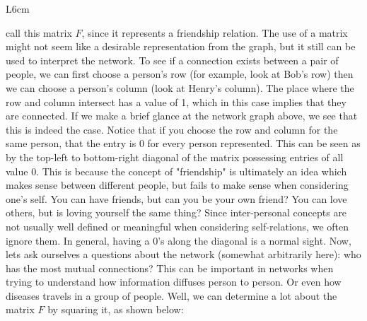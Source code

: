 \documentclass{article}
\begin{document}
     \begin{wrapfigure}[10]{L}{6cm} 
        \centering
        
        
    \end{wrapfigure}
    
 call this matrix \large $F$, since it represents a friendship relation. The use of a matrix might not seem like a desirable representation from the graph, but it still can be used to interpret the network. To see if a connection exists between a pair of people, we can first choose a person's row (for example, look at Bob's row) then we can choose a person's column (look at Henry's column). The place where the row and column intersect has a value of 1, which in this case implies that they are connected. If we make a brief glance at the network graph above, we see that this is indeed the case. Notice that if you choose the row and column for the same person, that the entry is 0 for every person represented. This can be seen as by the top-left to bottom-right diagonal of the matrix possessing entries of all value 0. This is because the concept of "friendship" is ultimately an idea which makes sense between different people, but fails to make sense when considering one's self. You can have friends, but can you be your own friend? You can love others, but is loving yourself the same thing? Since inter-personal concepts are not usually well defined or meaningful when considering self-relations, we often ignore them. In general, having a 0's along the diagonal is a normal sight. Now, lets ask ourselves a questions about the network (somewhat arbitrarily here): who has the most mutual connections? This can be important in networks when trying to understand how information diffuses person to person. Or even how diseases travels in a group of people. Well, we can determine a lot about the matrix \large $F$ by squaring it, as shown below:
\end{document}
